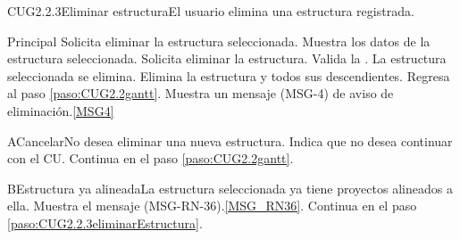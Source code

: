 	\begin{UseCase}{CUG2.2.3}{Eliminar estructura}{El usuario elimina una estructura registrada.}
	\end{UseCase}

	\begin{UCtrayectoria}{Principal}
		\UCpaso[\UCactor] Solicita eliminar la estructura seleccionada.
		\UCpaso Muestra los datos de la estructura seleccionada. \label{paso:CUG2.2.3eliminarEstructura}
		\UCpaso [\UCactor] Solicita eliminar la estructura. 
		\UCpaso Valida la . 
		\UCpaso La estructura seleccionada se elimina.
		\UCpaso Elimina la estructura y todos sus descendientes.
		\UCpaso Regresa al paso \ref{paso:CUG2.2gantt}.
		\UCpaso Muestra un mensaje (MSG-4) de aviso de eliminación.\ref{MSG4}
	\end{UCtrayectoria}

	\begin{UCtrayectoriaA}{A}{Cancelar}{No desea eliminar una nueva estructura.}
		\UCpaso[\UCactor] Indica que no desea continuar con el CU.
		\UCpaso Continua en el paso \ref{paso:CUG2.2gantt}.
	\end{UCtrayectoriaA}

	\begin{UCtrayectoriaA}{B}{Estructura ya alineada}{La estructura seleccionada ya tiene proyectos alineados a ella.}
		\UCpaso Muestra el mensaje (MSG-RN-36).\ref{MSG_RN36}.
		\UCpaso Continua en el paso \ref{paso:CUG2.2.3eliminarEstructura}.
	\end{UCtrayectoriaA}